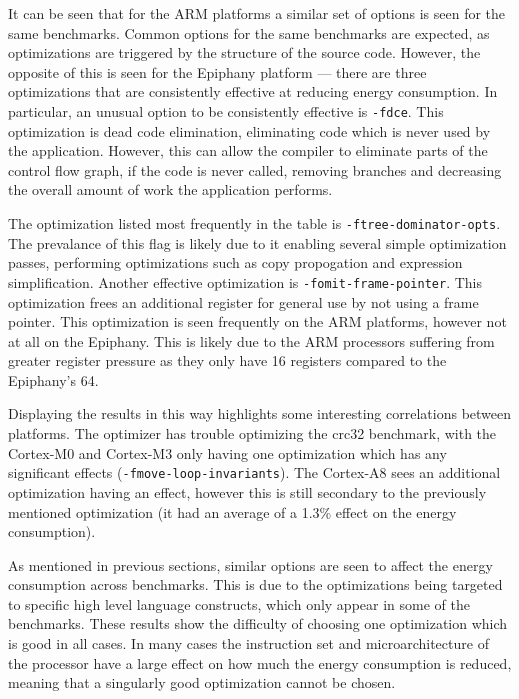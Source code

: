 \documentclass[twocolumn]{article}
\begin{document}
It can be seen that for the ARM platforms a similar set of options is seen for the same benchmarks. Common options for the same benchmarks are expected, as optimizations are triggered by the structure of the source code. However, the opposite of this is seen for the Epiphany platform --- there are three optimizations that are consistently effective at reducing energy consumption. In particular, an unusual option to be consistently effective is \texttt{-fdce}. This optimization is dead code elimination, eliminating code which is never used by the application. However, this can allow the compiler to eliminate parts of the control flow graph, if the code is never called, removing branches and decreasing the overall amount of work the application performs.

The optimization listed most frequently in the table is \texttt{-ftree-dominator-opts}. The prevalance of this flag is likely due to it enabling several simple optimization passes, performing optimizations such as copy propogation and expression simplification. Another effective optimization is \texttt{-fomit-frame-pointer}. This optimization frees an additional register for general use by not using a frame pointer. This optimization is seen frequently on the ARM platforms, however not at all on the Epiphany. This is likely due to the ARM processors suffering from greater register pressure as they only have 16 registers compared to the Epiphany's 64.

Displaying the results in this way highlights some interesting correlations between platforms. The optimizer has trouble optimizing the crc32 benchmark, with the Cortex-M0 and Cortex-M3 only having one optimization which has any significant effects (\texttt{-fmove-loop-invariants}). The Cortex-A8 sees an additional optimization having an effect, however this is still secondary to the previously mentioned optimization (it had an average of a 1.3\% effect on the energy consumption).

As mentioned in previous sections, similar options are seen to affect the energy consumption across benchmarks. This is due to the optimizations being targeted to specific high level language constructs, which only appear in some of the benchmarks. These results show the difficulty of choosing one optimization which is good in all cases. In many cases the instruction set and microarchitecture of the processor have a large effect on how much the energy consumption is reduced, meaning that a singularly good optimization cannot be chosen.
\end{document}

